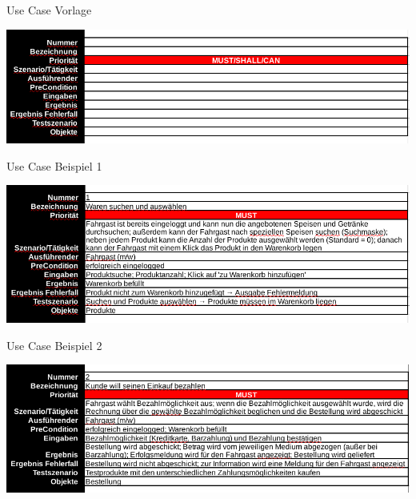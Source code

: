 \documentclass{beamer}
\begin{document}
\begin{frame}{Use Case Vorlage}
	\begin{center}
		\includegraphics[width=\textwidth]{img/use-case-vorlage.png}
	\end{center}
\end{frame}

\begin{frame}{Use Case Beispiel 1}
	\begin{center}
		\includegraphics[width=\textwidth]{img/use-case-bsp-1.png}
	\end{center}
\end{frame}

\begin{frame}{Use Case Beispiel 2}
	\begin{center}
		\includegraphics[width=\textwidth]{img/use-case-bsp-2.png}
	\end{center}
\end{frame}
\end{document}
